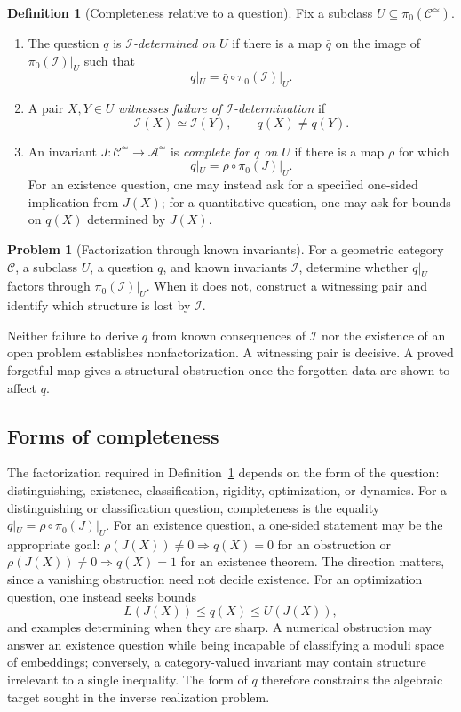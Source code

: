 \documentclass[11pt,letterpaper,twoside]{article}
\theoremstyle{plain}
\theoremstyle{definition}
\newtheorem{definition}[theorem]{Definition}
\newtheorem{problem}[theorem]{Problem}
\theoremstyle{remark}
\begin{document}
\begin{definition}[Completeness relative to a question]\label{def:information-deficit}
Fix a subclass \(U\subseteq\pi_0(\mathcal C^{\simeq})\).
\begin{enumerate}
\item The question \(q\) is \emph{\(\mathcal I\)-determined on \(U\)} if there is a map \(\bar q\) on the image of \(\pi_0(\mathcal I)|_U\) such that
\[
 q|_U=\bar q\circ\pi_0(\mathcal I)|_U.
\]
\item A pair \(X,Y\in U\) \emph{witnesses failure of \(\mathcal I\)-determination} if
\[
 \mathcal I(X)\simeq\mathcal I(Y),
 \qquad q(X)\ne q(Y).
\]
\item An invariant
\(J\colon\mathcal C^{\simeq}\to\mathcal A^{\simeq}\) is \emph{complete for \(q\) on \(U\)} if there is a map \(\rho\) for which
\[
 q|_U=\rho\circ\pi_0(J)|_U.
\]
For an existence question, one may instead ask for a specified one-sided implication from \(J(X)\); for a quantitative question, one may ask for bounds on \(q(X)\) determined by \(J(X)\).
\end{enumerate}
\end{definition}

\begin{problem}[Factorization through known invariants]\label{prob:known-invariant-factorization}
For a geometric category \(\mathcal C\), a subclass \(U\), a question \(q\), and known invariants \(\mathcal I\), determine whether \(q|_U\) factors through \(\pi_0(\mathcal I)|_U\).  When it does not, construct a witnessing pair and identify which structure is lost by \(\mathcal I\).
\end{problem}

Neither failure to derive \(q\) from known consequences of \(\mathcal I\) nor the existence of an open problem establishes nonfactorization.  A witnessing pair is decisive.  A proved forgetful map gives a structural obstruction once the forgotten data are shown to affect \(q\).

\subsection{Forms of completeness}

The factorization required in Definition~\ref{def:information-deficit} depends on the form of the question: distinguishing, existence, classification, rigidity, optimization, or dynamics.  For a distinguishing or classification question, completeness is the equality \(q|_U=\rho\circ\pi_0(J)|_U\).  For an existence question, a one-sided statement may be the appropriate goal: \(\rho(J(X))\ne0\Rightarrow q(X)=0\) for an obstruction or \(\rho(J(X))\ne0\Rightarrow q(X)=1\) for an existence theorem.  The direction matters, since a vanishing obstruction need not decide existence.  For an optimization question, one instead seeks bounds
\[
 L(J(X))\le q(X)\le U(J(X)),
\]
and examples determining when they are sharp.  A numerical obstruction may answer an existence question while being incapable of classifying a moduli space of embeddings; conversely, a category-valued invariant may contain structure irrelevant to a single inequality.  The form of \(q\) therefore constrains the algebraic target sought in the inverse realization problem.
\end{document}
